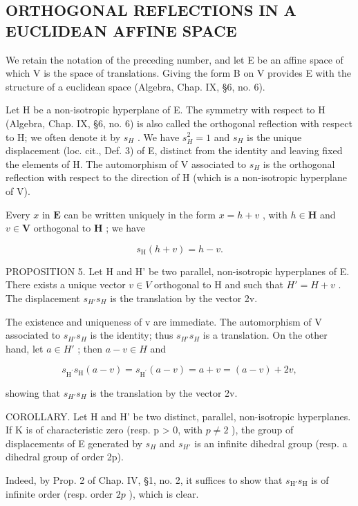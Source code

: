 \subsection{ORTHOGONAL REFLECTIONS IN A EUCLIDEAN AFFINE SPACE}

We retain the notation of the preceding number, and let E be an affine space of which V is the space of translations. Giving the form B on V provides E with the structure of a euclidean space (Algebra, Chap. IX, §6, no. 6).

Let H be a non-isotropic hyperplane of E. The symmetry with respect to H (Algebra, Chap. IX, §6, no. 6) is also called the orthogonal reflection with respect to H; we often denote it by \(s_{H}\) . We have \(s_{H}^{2}=1\) and \(s_{H}\) is the unique displacement (loc. cit., Def. 3) of E, distinct from the identity and leaving fixed the elements of H. The automorphism of V associated to \(s_{H}\) is the orthogonal reflection with respect to the direction of H (which is a non-isotropic hyperplane of V).

Every \(x\) in \(\mathbf{E}\) can be written uniquely in the form \(x = h + v\) , with \(h \in \mathbf{H}\) and \(v \in \mathbf{V}\) orthogonal to \(\mathbf{H}\) ; we have

\[
s _ {\mathrm{H}} (h + v) = h - v.
\]

PROPOSITION 5. Let H and H' be two parallel, non-isotropic hyperplanes of E. There exists a unique vector \(v \in V\) orthogonal to H and such that \(H' = H + v\) . The displacement \(s_{H'} s_{H}\) is the translation by the vector 2v.

The existence and uniqueness of v are immediate. The automorphism of V associated to \(s_{H'}s_{H}\) is the identity; thus \(s_{H'}s_{H}\) is a translation. On the other hand, let \(a \in H'\) ; then \(a - v \in H\) and

\[
s _ {\mathrm {H^ {\prime}}} s _ {\mathrm{H}} (a - v) = s _ {\mathrm {H^ {\prime}}} (a - v) = a + v = (a - v) + 2 v,
\]

showing that \(s_{H'}s_{H}\) is the translation by the vector 2v.

COROLLARY. Let H and H' be two distinct, parallel, non-isotropic hyperplanes. If K is of characteristic zero (resp. p \textgreater{} 0, with \(p \neq 2\) ), the group of displacements of E generated by \(s_{H}\) and \(s_{H'}\) is an infinite dihedral group (resp. a dihedral group of order 2p).

Indeed, by Prop. 2 of Chap. IV, §1, no. 2, it suffices to show that \(s_{\mathrm{H}'}s_{\mathrm{H}}\) is of infinite order (resp. order \(2p\) ), which is clear.

